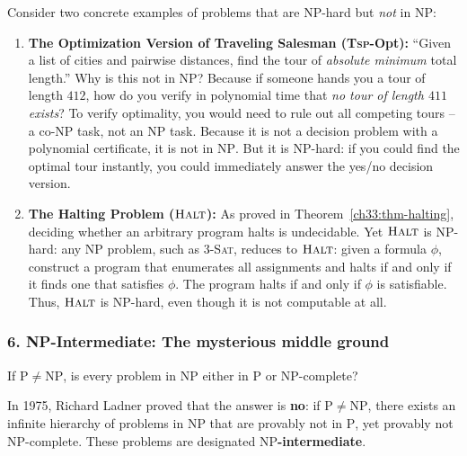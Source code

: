 Consider two concrete examples of problems that are $\mathrm{NP}$-hard but \emph{not} in $\mathrm{NP}$:
\begin{enumerate}
  \item \textbf{The Optimization Version of Traveling Salesman (\textsc{Tsp}-Opt):} ``Given a list of cities and pairwise distances, find the tour of \emph{absolute minimum} total length.''
        Why is this not in $\mathrm{NP}$? Because if someone hands you a tour of length $412$, how do you verify in polynomial time that \emph{no tour of length $411$ exists}? To verify optimality, you would need to rule out all competing tours -- a $\mathrm{co\text{-}NP}$ task, not an $\mathrm{NP}$ task. Because it is not a decision problem with a polynomial certificate, it is not in $\mathrm{NP}$. But it is $\mathrm{NP}$-hard: if you could find the optimal tour instantly, you could immediately answer the yes/no decision version.
  \item \textbf{The Halting Problem ($\textsc{Halt}$):} As proved in Theorem~\ref{ch33:thm-halting}, deciding whether an arbitrary program halts is undecidable. Yet $\textsc{Halt}$ is $\mathrm{NP}$-hard: any $\mathrm{NP}$ problem, such as \textsc{3-Sat}, reduces to $\textsc{Halt}$: given a formula $\phi$, construct a program that enumerates all assignments and halts if and only if it finds one that satisfies $\phi$. The program halts if and only if $\phi$ is satisfiable. Thus, $\textsc{Halt}$ is $\mathrm{NP}$-hard, even though it is not computable at all.
\end{enumerate}

\subsubsection{6. NP-Intermediate: The mysterious middle ground}
If $\mathrm{P} \neq \mathrm{NP}$, is every problem in $\mathrm{NP}$ either in $\mathrm{P}$ or $\mathrm{NP}$-complete?

In 1975, Richard Ladner proved that the answer is \textbf{no}: if $\mathrm{P} \neq \mathrm{NP}$, there exists an infinite hierarchy of problems in $\mathrm{NP}$ that are provably not in $\mathrm{P}$, yet provably not $\mathrm{NP}$-complete. These problems are designated \textbf{$\mathrm{NP}$-intermediate}.

